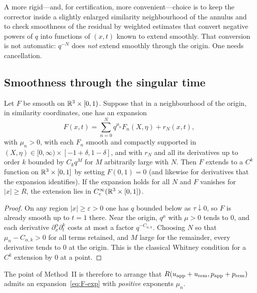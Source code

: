 A more rigid---and, for certification, more convenient---choice is to keep the corrector inside a slightly enlarged similarity neighbourhood of the annulus and to check smoothness of the residual by weighted estimates that convert negative powers of $q$ into functions of $(x,t)$ known to extend smoothly. That conversion is not automatic: $q^{-N}$ does \emph{not} extend smoothly through the origin. One needs cancellation.

\subsection{Smoothness through the singular time}

\begin{lemma}
\label{lem:smooth-ext}
Let $F$ be smooth on $\mathbb{R}^3\times[0,1)$. Suppose that in a neighbourhood of the origin, in similarity coordinates, one has an expansion
\begin{equation}
\label{eq:F-exp}
F(x,t)=\sum_{n=0}^{N} q^{\mu_n} F_n(X,\eta)
+r_N(x,t),
\end{equation}
with $\mu_n>0$, with each $F_n$ smooth and compactly supported in $(X,\eta)\in[0,\infty)\times[-1+\delta,1-\delta]$, and with $r_N$ and all its derivatives up to order $k$ bounded by $C_k q^{M}$ for $M$ arbitrarily large with $N$. Then $F$ extends to a $C^k$ function on $\mathbb{R}^3\times[0,1]$ by setting $F(0,1)=0$ (and likewise for derivatives that the expansion identifies). If the expansion holds for all $N$ and $F$ vanishes for $|x|\ge R$, the extension lies in $C_c^\infty(\mathbb{R}^3\times[0,1])$.
\end{lemma}

\begin{proof}
On any region $|x|\ge\varepsilon>0$ one has $q$ bounded below as $\tau\downarrow 0$, so $F$ is already smooth up to $t=1$ there. Near the origin, $q^{\mu}$ with $\mu>0$ tends to $0$, and each derivative $\partial_x^\alpha\partial_t^k$ costs at most a factor $q^{-C_{\alpha,k}}$. Choosing $N$ so that $\mu_n-C_{\alpha,k}>0$ for all terms retained, and $M$ large for the remainder, every derivative tends to $0$ at the origin. This is the classical {W}hitney condition for a $C^k$ extension by $0$ at a point.
\end{proof}

The point of Method~II is therefore to arrange that $R(u_{\mathrm{app}}+u_{\mathrm{rem}},p_{\mathrm{app}}+p_{\mathrm{rem}})$ admits an expansion~\eqref{eq:F-exp} with \emph{positive} exponents $\mu_n$.

